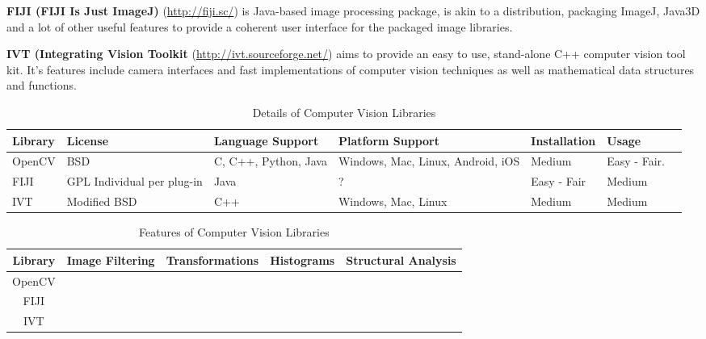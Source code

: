 \documentclass[11pt,fleqn,twoside]{article}
\begin{document}
\textbf{FIJI (FIJI Is Just ImageJ)} (\url{http://fiji.sc/}) is Java-based image processing package,
is akin to a distribution, packaging ImageJ, Java3D and a lot of other useful features to provide
a coherent user interface for the packaged image libraries.

\textbf{IVT (Integrating Vision Toolkit} (\url{http://ivt.sourceforge.net/}) aims to provide an
easy to use, stand-alone C++ computer vision tool kit. It's features include camera interfaces and
fast implementations of computer vision techniques as well as mathematical data structures and 
functions.



\begin{table}[p]
\begin{tabular}{| p{6em} | p{6em} | p{6em} | p{6em} | p{6em} | p{6em} | p{6em} |}
\hline
\textbf{Library} & \textbf{License} & \textbf{Language Support} & \textbf{Platform Support} & 
\textbf{Installation} & \textbf{Usage}\\ \hline

OpenCV & BSD & C, C++, Python, Java & Windows, Mac, Linux, Android, iOS & Medium & Easy - Fair. \\ \hline

FIJI & GPL \newline Individual per plug-in & Java & ? & Easy - Fair & Medium \\ \hline

IVT & Modified BSD & C++ & Windows, Mac, Linux & Medium & Medium \\ \hline

\hline
\end{tabular}
\caption{Details of Computer Vision Libraries}
\end{table}

\begin{table}[p]
\begin{tabular}{| c | c | c | c | c |}
\hline
\textbf{Library} & \textbf{Image Filtering} & \textbf{Transformations} & \textbf{Histograms} & \textbf{Structural Analysis} \\ \hline

OpenCV 	& \checkmark	& \checkmark	& \checkmark	& \checkmark 	\\ \hline
FIJI	& 		&		&		&		\\ \hline
IVT	&		&		&		&		\\ \hline
\end{tabular}
\caption{Features of Computer Vision Libraries}
\end{table}
\end{document}
